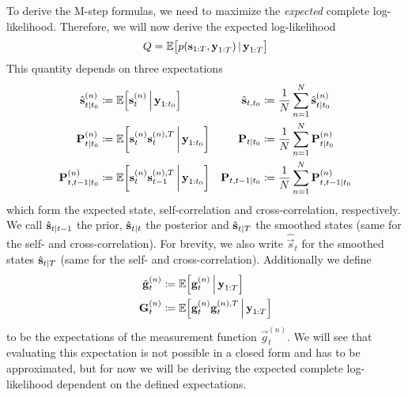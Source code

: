 	To derive the M-step formulas, we need to maximize the \emph{expected} complete log-likelihood. Therefore, we will now derive the expected log-likelihood
	\begin{equation*}
		Q = \mathbb{E}\big[ p(\boldsymbol{\mathrm{s}}_{1:T}, \boldsymbol{\mathrm{y}}_{1:T}) \,\vert\, \boldsymbol{\mathrm{y}}_{1:T} \big]
	\end{equation*}
	This quantity depends on three expectations
	\begin{align*}
		\hat{\boldsymbol{\mathrm{s}}}_{t \vert t_0}^{(n)}  &\coloneqq \mathbb{E}\Big[\boldsymbol{\mathrm{s}}_t^{(n)} \,\Big\vert\, \boldsymbol{\mathrm{y}}_{1:t_0}\Big]
			& \hat{\boldsymbol{\mathrm{s}}}_{t, t_0}           &\coloneqq \frac{1}{N} \sum_{n = 1}^{N} \hat{\boldsymbol{\mathrm{s}}}_{t \vert t_0}^{(n)} \\
		\boldsymbol{\mathrm{P}}_{t \vert t_0}^{(n)}        &\coloneqq \mathbb{E}\bigg[\boldsymbol{\mathrm{s}}_t^{(n)} \boldsymbol{\mathrm{s}}_t^{(n), T} \,\bigg\vert\, \boldsymbol{\mathrm{y}}_{1:t_0}\bigg]
			& \boldsymbol{\mathrm{P}}_{t \vert t_0}        &\coloneqq \frac{1}{N} \sum_{n = 1}^{N} \boldsymbol{\mathrm{P}}_{t \vert t_0}^{(n)} \\
		\boldsymbol{\mathrm{P}}_{t, t - 1 \vert t_0}^{(n)} &\coloneqq \mathbb{E}\bigg[\boldsymbol{\mathrm{s}}_t^{(n)} \boldsymbol{\mathrm{s}}_{t - 1}^{(n), T} \,\bigg\vert\, \boldsymbol{\mathrm{y}}_{1:t_0}\bigg]
			& \boldsymbol{\mathrm{P}}_{t, t - 1 \vert t_0} &\coloneqq \frac{1}{N} \sum_{n = 1}^{N} \boldsymbol{\mathrm{P}}_{t, t - 1 \vert t_0}^{(n)}
	\end{align*}
	which form the expected state, self-correlation and cross-correlation, respectively. We call \( \hat{\boldsymbol{\mathrm{s}}}_{t \vert t - 1} \) the prior, \( \hat{\boldsymbol{\mathrm{s}}}_{t \vert t} \) the posterior and \( \hat{\boldsymbol{\mathrm{s}}}_{t \vert T} \) the smoothed states (same for the self- and cross-correlation). For brevity, we also write \( \hat{\vec{s}}_t \) for the smoothed states \( \hat{\boldsymbol{\mathrm{s}}}_{t \vert T} \) (same for the self- and cross-correlation). Additionally we define
	\begin{align}
		\hat{\boldsymbol{\mathrm{g}}}_t^{(n)} &\coloneqq \mathbb{E}\Big[\boldsymbol{\mathrm{g}}_t^{(n)} \,\Big\vert\, \boldsymbol{\mathrm{y}}_{1:T}\Big]  \label{eq:expectedMeasurement} \\
		\boldsymbol{\mathrm{G}}_t^{(n)}       &\coloneqq \mathbb{E}\Big[\boldsymbol{\mathrm{g}}_t^{(n)} \boldsymbol{\mathrm{g}}_t^{(n), T} \,\Big\vert\, \boldsymbol{\mathrm{y}}_{1:T}\Big]  \label{eq:expectedMeasurementMat}
	\end{align}
	to be the expectations of the measurement function \( \vec{g}_t^{(n)} \). We will see that evaluating this expectation is not possible in a closed form and has to be approximated, but for now we will be deriving the expected complete log-likelihood dependent on the defined expectations.

